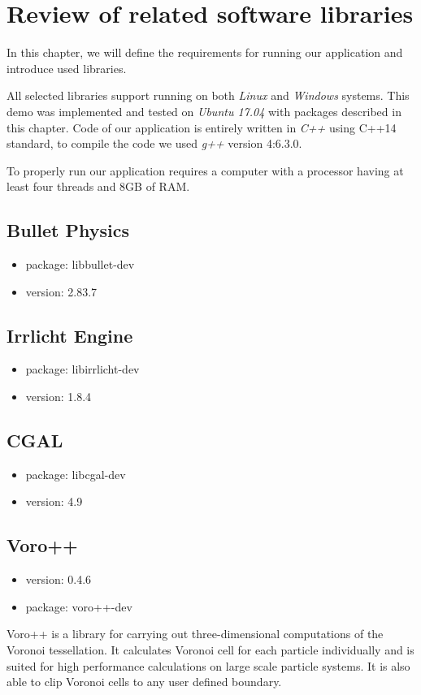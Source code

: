 \chapter{Review of related software libraries}
\label{chapt:technology}
In this chapter, we will define the requirements for running our application and introduce used libraries.

All selected libraries support running on both \emph{Linux} and \emph{Windows} systems. This demo was implemented and tested on \emph{Ubuntu 17.04} with packages described in this chapter. Code of our application is entirely written in \emph{C++} using C++14 standard, to compile the code we used \emph{g++} version 4:6.3.0.

To properly run our application requires a computer with a processor having at least four threads and 8GB of RAM.

\section{Bullet Physics}
\begin{itemize}
\item package: libbullet-dev
\item version: 2.83.7
\end{itemize}


\section{Irrlicht Engine}
\begin{itemize}
\item package: libirrlicht-dev
\item version: 1.8.4
\end{itemize}

\section{CGAL}
\begin{itemize}
\item package: libcgal-dev
\item version: 4.9
\end{itemize}

\section{Voro++}
\begin{itemize}
\item version: 0.4.6
\item package: voro++-dev
\end{itemize}
Voro++ is a library for carrying out three-dimensional computations of the Voronoi tessellation. It calculates Voronoi cell for each particle individually and is suited for high performance calculations on large scale particle systems. It is also able to clip Voronoi cells to any user defined boundary.

